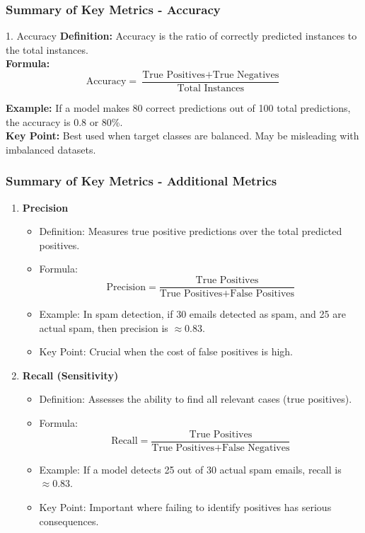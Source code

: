 \documentclass[aspectratio=169]{beamer}
\begin{document}
\begin{frame}[fragile]
    \frametitle{Summary of Key Metrics - Accuracy}
    \begin{block}{1. Accuracy}
        \textbf{Definition:} 
        Accuracy is the ratio of correctly predicted instances to the total instances.\\

        \textbf{Formula:} 
        \begin{equation}
            \text{Accuracy} = \frac{\text{True Positives} + \text{True Negatives}}{\text{Total Instances}}
        \end{equation}
        
        \textbf{Example:}
        If a model makes 80 correct predictions out of 100 total predictions, the accuracy is 0.8 or 80\%.\\

        \textbf{Key Point:} 
        Best used when target classes are balanced. May be misleading with imbalanced datasets.
    \end{block}
\end{frame}

\begin{frame}[fragile]
    \frametitle{Summary of Key Metrics - Additional Metrics}
    \begin{enumerate}
        \item \textbf{Precision}
            \begin{itemize}
                \item Definition: Measures true positive predictions over the total predicted positives.
                \item Formula: 
                \[
                \text{Precision} = \frac{\text{True Positives}}{\text{True Positives} + \text{False Positives}}
                \]
                \item Example: In spam detection, if 30 emails detected as spam, and 25 are actual spam, then precision is \( \approx 0.83 \).
                \item Key Point: Crucial when the cost of false positives is high.
            \end{itemize}
        
        \item \textbf{Recall (Sensitivity)}
            \begin{itemize}
                \item Definition: Assesses the ability to find all relevant cases (true positives).
                \item Formula: 
                \[
                \text{Recall} = \frac{\text{True Positives}}{\text{True Positives} + \text{False Negatives}}
                \]
                \item Example: If a model detects 25 out of 30 actual spam emails, recall is \( \approx 0.83 \).
                \item Key Point: Important where failing to identify positives has serious consequences.
            \end{itemize}
    \end{enumerate}
\end{frame}
\end{document}
